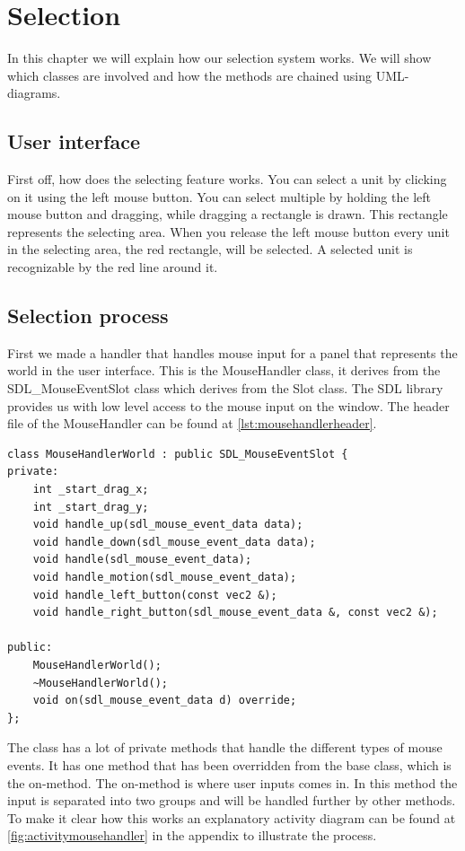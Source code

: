 \section{Selection} In this chapter we will explain how our selection system
works. We will show which classes are involved and how the methods are chained
using UML-diagrams. 

\subsection{User interface} First off, how does the selecting feature works.
You can select a unit by clicking on it using the left mouse button. You can
select multiple by holding the left mouse button and dragging, while dragging a
rectangle is drawn. This rectangle represents the selecting area. When you
release the left mouse button every unit in the selecting area, the red
rectangle, will be selected. A selected unit is recognizable by the red line
around it.

\subsection{Selection process} First we made a handler that handles mouse input
for a panel that represents the world in the user interface. This is the
MouseHandler class, it derives from the SDL\_MouseEventSlot class which derives
from the Slot class. The SDL library provides us with low level access to the
mouse input on the window.  The header file of the MouseHandler can be found 
at \cref{lst:mousehandlerheader}.

\begin{lstlisting}[caption={Mouse handler header file.},
label={lst:mousehandlerheader}]
class MouseHandlerWorld : public SDL_MouseEventSlot {
private: 
    int _start_drag_x; 
    int _start_drag_y;
    void handle_up(sdl_mouse_event_data data); 
    void handle_down(sdl_mouse_event_data data); 
    void handle(sdl_mouse_event_data);
    void handle_motion(sdl_mouse_event_data);
    void handle_left_button(const vec2 &); 
    void handle_right_button(sdl_mouse_event_data &, const vec2 &);

public: 
    MouseHandlerWorld(); 
    ~MouseHandlerWorld(); 
    void on(sdl_mouse_event_data d) override; 
}; 
\end{lstlisting}

The class has a lot of private methods that handle the different types of mouse
events. It has one method that has been overridden from the base class, which
is the on-method. The on-method is where user inputs comes in. In this method
the input is separated into two groups and will be handled further by other
methods. To make it clear how this works an explanatory activity diagram can be
found at \cref{fig:activitymousehandler} in the appendix to illustrate the
process. 

